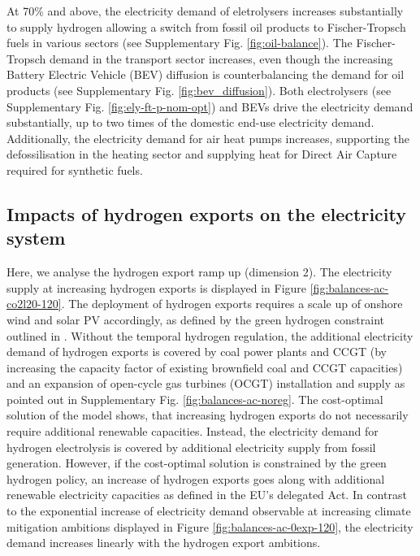 \documentclass[5p,numafflabel]{elsarticle}
\begin{document}
At 70\% and above, the electricity demand of eletrolysers increases substantially to supply hydrogen allowing a switch from fossil oil products to Fischer-Tropsch fuels in various sectors (see Supplementary Fig. \ref{fig:oil-balance}). 
The Fischer-Tropsch demand in the transport sector increases, even though the increasing Battery Electric Vehicle (BEV) diffusion is counterbalancing the demand for oil products (see Supplementary Fig. \ref{fig:bev_diffusion}). 
Both electrolysers (see Supplementary Fig. \ref{fig:ely-ft-p-nom-opt}) and BEVs drive the electricity demand substantially, up to two times of the domestic end-use electricity demand. 
Additionally, the electricity demand for air heat pumps increases, supporting the defossilisation in the heating sector and supplying heat for Direct Air Capture required for synthetic fuels.


\subsection*{Impacts of hydrogen exports on the electricity system}
\label{subsec:increase_h2}

Here, we analyse the hydrogen export ramp up (dimension 2). The electricity supply at increasing hydrogen exports is displayed in Figure \ref{fig:balances-ac-co2l20-120}. The deployment of hydrogen exports requires a scale up of onshore wind and solar PV accordingly, as defined by the green hydrogen constraint outlined in .
Without the temporal hydrogen regulation, the additional electricity demand of hydrogen exports is covered by coal power plants and CCGT (by increasing the capacity factor of existing brownfield coal and CCGT capacities) and an expansion of open-cycle gas turbines (OCGT) installation and supply as pointed out in Supplementary Fig. \ref{fig:balances-ac-noreg}.
The cost-optimal solution of the model shows, that increasing hydrogen exports do not necessarily require additional renewable capacities. Instead, the electricity demand for hydrogen electrolysis is covered by additional electricity supply from fossil generation. However, if the cost-optimal solution is constrained by the green hydrogen policy, an increase of hydrogen exports goes along with additional renewable electricity capacities as defined in the EU's delegated Act.
In contrast to the exponential increase of electricity demand observable at increasing climate mitigation ambitions displayed in Figure \ref{fig:balances-ac-0exp-120}, the electricity demand increases linearly with the hydrogen export ambitions.
\end{document}
